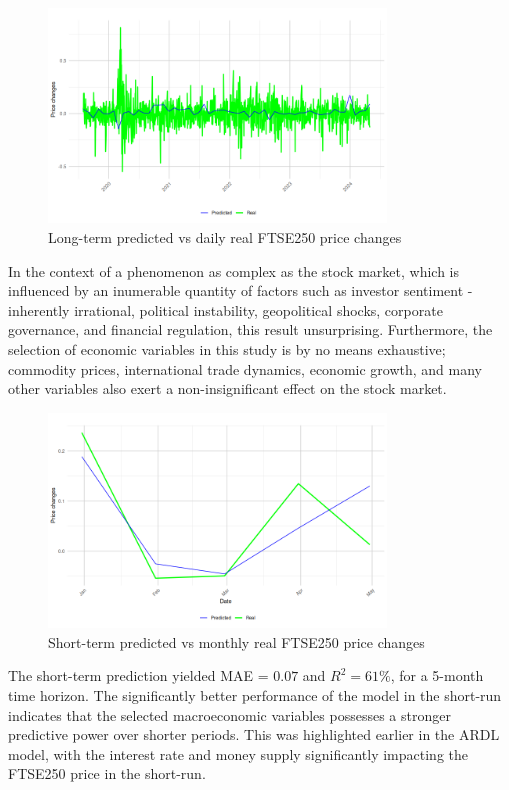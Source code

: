 \documentclass[11pt,a4paper]{article}
\begin{document}
\begin{figure}[h]
    \centering
    \includegraphics[width=0.8\textwidth]{long-term-daily.png}
    \caption{Long-term predicted vs daily real FTSE250 price changes}
    \label{fig:ldaily}
\end{figure}

In the context of a phenomenon as complex as the stock market,
which is influenced by an inumerable quantity of factors such as investor sentiment
- inherently irrational, 
political instability, geopolitical shocks, corporate governance, and financial regulation, this result 
unsurprising. Furthermore, the selection of economic variables in this study
is by no means exhaustive; commodity prices, international trade dynamics,
economic growth, and many other variables also exert a non-insignificant 
effect on the stock market.

\begin{figure}[h]
    \centering
    \includegraphics[width=0.8\textwidth]{short-term-monthly.png}
    \caption{Short-term predicted vs monthly real FTSE250 price changes}
    \label{fig:smonthly}
\end{figure}

The short-term prediction yielded MAE = $0.07$ and 
$R^2 = 61\%$, for a 5-month time horizon.
The significantly better performance of the model in the short-run
indicates that the selected macroeconomic variables possesses
a stronger predictive power over shorter periods. This was highlighted 
earlier in the ARDL model, with the interest rate and money supply significantly
impacting the FTSE250 price in the short-run. 
\end{document}
